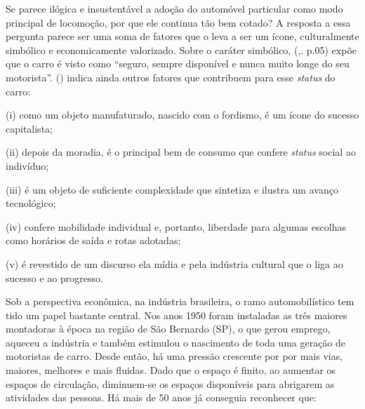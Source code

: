 Se parece ilógica e insustentável a adoção do automóvel particular como modo principal de locomoção, por que ele continua tão bem cotado? A resposta a essa pergunta parece ser uma soma de fatores que o leva a ser um ícone, culturalmente simbólico e economicamente valorizado. 
Sobre o caráter simbólico,  (\citeyear{BANISTER2005},. p.05) expõe que o carro é visto como ``seguro, sempre disponível e nunca muito longe do seu motorista''.  (\citeyear{URRY2001}) indica ainda outros fatores que contribuem para esse \emph{status} do carro: 
\begin{compactitem}[]
\item (i) como um objeto manufaturado, nascido com o fordismo, é um ícone do sucesso capitalista; 
\item (ii) depois da moradia, é o principal bem de consumo que confere \emph{status} social ao indivíduo;
\item (iii) é um objeto de suficiente complexidade que sintetiza e ilustra um avanço tecnológico;
\item (iv) confere mobilidade individual e, portanto, liberdade para algumas escolhas como horários de saída e rotas adotadas;
\item (v) é revestido de um discurso ela mídia e pela indústria cultural que o liga ao sucesso e ao progresso.
\end{compactitem}

Sob a perspectiva econômica, na indústria brasileira, o ramo automobilístico tem tido um papel bastante central. Nos anos 1950 foram instaladas as três maiores montadoras à época na região de São Bernardo (SP), o que gerou emprego, aqueceu a indústria e também estimulou o nascimento de toda uma geração de motoristas de carro. Desde então, há uma pressão crescente por por mais vias, maiores, melhores e mais fluidas.
Dado que o espaço é finito, ao aumentar os espaços de circulação, diminuem-se os espaços disponíveis para abrigarem as atividades das pessoas. Há mais de 50 anos  já conseguia reconhecer que:

